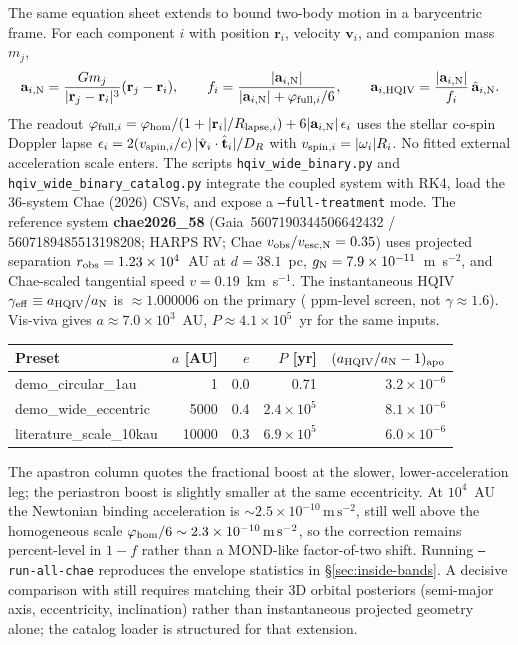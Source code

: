\documentclass[11pt]{amsart}
\begin{document}
The same equation sheet extends to bound two-body motion in a barycentric frame.
For each component $i$ with position $\mathbf r_i$, velocity $\mathbf v_i$, and
companion mass $m_j$,
\[
\mathbf a_{i,{\rm N}}=\frac{G m_j}{|\mathbf r_j-\mathbf r_i|^3}(\mathbf r_j-\mathbf r_i),
\qquad
f_i=\frac{|\mathbf a_{i,{\rm N}}|}{|\mathbf a_{i,{\rm N}}|+\varphi_{{\rm full},i}/6},
\qquad
\mathbf a_{i,{\rm HQIV}}=\frac{|\mathbf a_{i,{\rm N}}|}{f_i}\,\hat{\mathbf a}_{i,{\rm N}}.
\]
The readout $\varphi_{{\rm full},i}=\varphi_{\rm hom}/(1+|\mathbf r_i|/R_{{\rm lapse},i})
+6|\mathbf a_{i,{\rm N}}|\,\epsilon_i$ uses the stellar co-spin Doppler lapse
$\epsilon_i=2(v_{{\rm spin},i}/c)\,|\hat{\mathbf v}_i\cdot\hat{\mathbf t}_i|/D_R$
with $v_{{\rm spin},i}=|\omega_i|R_i$. No fitted external acceleration scale enters.
The scripts \texttt{hqiv\_wide\_binary.py} and \texttt{hqiv\_wide\_binary\_catalog.py}
integrate the coupled system with RK4, load the 36-system Chae (2026) CSVs, and expose
a \texttt{--full-treatment} mode. The reference system \textbf{chae2026\_58}
(Gaia~5607190344506642432 / 5607189485513198208; HARPS RV; Chae
$v_{\rm obs}/v_{\rm esc,N}=0.35$) uses projected separation
$r_{\rm obs}=1.23\times10^{4}$~AU at $d=38.1$~pc, $g_{\rm N}=7.9\times10^{-11}$~m~s$^{-2}$,
and Chae-scaled tangential speed $v=0.19$~km~s$^{-1}$. The instantaneous HQIV
$\gamma_{\rm eff}\equiv a_{\rm HQIV}/a_{\rm N}$ is $\approx1.000006$ on the primary
( ppm-level screen, not $\gamma\approx1.6$). Vis-viva gives $a\approx7.0\times10^{3}$~AU,
$P\approx4.1\times10^{5}$~yr for the same inputs.

\begin{center}
\begin{tabular}{@{}lrrrr@{}}
\toprule
Preset & $a$ [AU] & $e$ & $P$ [yr] & $(a_{\rm HQIV}/a_{\rm N}-1)_{\rm apo}$ \\
\midrule
demo\_circular\_1au      & 1     & 0.0 & 0.71      & $3.2\times10^{-6}$ \\
demo\_wide\_eccentric    & 5000  & 0.4 & $2.4\times10^{5}$ & $8.1\times10^{-6}$ \\
literature\_scale\_10kau & 10000 & 0.3 & $6.9\times10^{5}$ & $6.0\times10^{-6}$ \\
\bottomrule
\end{tabular}
\end{center}
The apastron column quotes the fractional boost at the slower, lower-acceleration leg;
the periastron boost is slightly smaller at the same eccentricity. At $10^4$~AU the
Newtonian binding acceleration is $\sim2.5\times10^{-10}\,\mathrm{m\,s^{-2}}$, still
well above the homogeneous scale $\varphi_{\rm hom}/6\sim2.3\times10^{-10}\,\mathrm{m\,s^{-2}}$,
so the correction remains percent-level in $1-f$ rather than a MOND-like factor-of-two
shift. Running \texttt{--run-all-chae} reproduces the envelope statistics in
\S\ref{sec:inside-bands}. A decisive comparison with
\cite{chae2026wide,saad2026wide} still requires matching their 3D orbital posteriors
(semi-major axis, eccentricity, inclination) rather than instantaneous projected geometry
alone; the catalog loader is structured for that extension.
\end{document}
